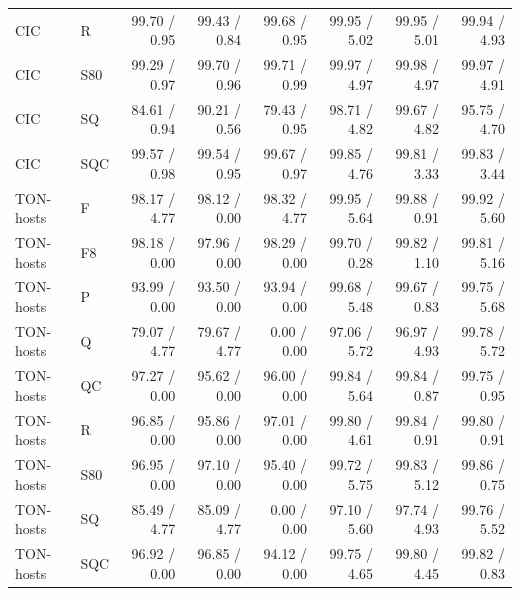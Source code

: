 \documentclass[10pt]{article}
\begin{document}
{\begin{longtable}{llrrrrrr}
CIC & R & 99.70 / 0.95 & 99.43 / 0.84 & 99.68 / 0.95 & 99.95 / 5.02 & 99.95 / 5.01 & 99.94 / 4.93 \\
CIC & S80 & 99.29 / 0.97 & 99.70 / 0.96 & 99.71 / 0.99 & 99.97 / 4.97 & 99.98 / 4.97 & 99.97 / 4.91 \\
CIC & SQ & 84.61 / 0.94 & 90.21 / 0.56 & 79.43 / 0.95 & 98.71 / 4.82 & 99.67 / 4.82 & 95.75 / 4.70 \\
CIC & SQC & 99.57 / 0.98 & 99.54 / 0.95 & 99.67 / 0.97 & 99.85 / 4.76 & 99.81 / 3.33 & 99.83 / 3.44 \\
TON-hosts & F & 98.17 / 4.77 & 98.12 / 0.00 & 98.32 / 4.77 & 99.95 / 5.64 & 99.88 / 0.91 & 99.92 / 5.60 \\
TON-hosts & F8 & 98.18 / 0.00 & 97.96 / 0.00 & 98.29 / 0.00 & 99.70 / 0.28 & 99.82 / 1.10 & 99.81 / 5.16 \\
TON-hosts & P & 93.99 / 0.00 & 93.50 / 0.00 & 93.94 / 0.00 & 99.68 / 5.48 & 99.67 / 0.83 & 99.75 / 5.68 \\
TON-hosts & Q & 79.07 / 4.77 & 79.67 / 4.77 & 0.00 / 0.00 & 97.06 / 5.72 & 96.97 / 4.93 & 99.78 / 5.72 \\
TON-hosts & QC & 97.27 / 0.00 & 95.62 / 0.00 & 96.00 / 0.00 & 99.84 / 5.64 & 99.84 / 0.87 & 99.75 / 0.95 \\
TON-hosts & R & 96.85 / 0.00 & 95.86 / 0.00 & 97.01 / 0.00 & 99.80 / 4.61 & 99.84 / 0.91 & 99.80 / 0.91 \\
TON-hosts & S80 & 96.95 / 0.00 & 97.10 / 0.00 & 95.40 / 0.00 & 99.72 / 5.75 & 99.83 / 5.12 & 99.86 / 0.75 \\
TON-hosts & SQ & 85.49 / 4.77 & 85.09 / 4.77 & 0.00 / 0.00 & 97.10 / 5.60 & 97.74 / 4.93 & 99.76 / 5.52 \\
TON-hosts & SQC & 96.92 / 0.00 & 96.85 / 0.00 & 94.12 / 0.00 & 99.75 / 4.65 & 99.80 / 4.45 & 99.82 / 0.83 \\
\end{longtable}}
\end{document}
